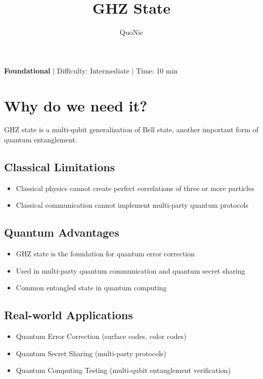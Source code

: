 \documentclass[12pt,a4paper]{article}
\title{GHZ State}
\author{QuoNic}
\date{}
\begin{document}
\maketitle

\begin{center}
\textbf{Foundational} | Difficulty: Intermediate | Time: 10 min
\end{center}

\tableofcontents
\newpage

\section{Why do we need it?}

GHZ state is a multi-qubit generalization of Bell state, another important form of quantum entanglement.

\subsection{Classical Limitations}
\begin{itemize}
  \item Classical physics cannot create perfect correlations of three or more particles
  \item Classical communication cannot implement multi-party quantum protocols
\end{itemize}

\subsection{Quantum Advantages}
\begin{itemize}
  \item GHZ state is the foundation for quantum error correction
  \item Used in multi-party quantum communication and quantum secret sharing
  \item Common entangled state in quantum computing
\end{itemize}

\subsection{Real-world Applications}
\begin{itemize}
  \item Quantum Error Correction (surface codes, color codes)
  \item Quantum Secret Sharing (multi-party protocols)
  \item Quantum Computing Testing (multi-qubit entanglement verification)
\end{itemize}
\end{document}
